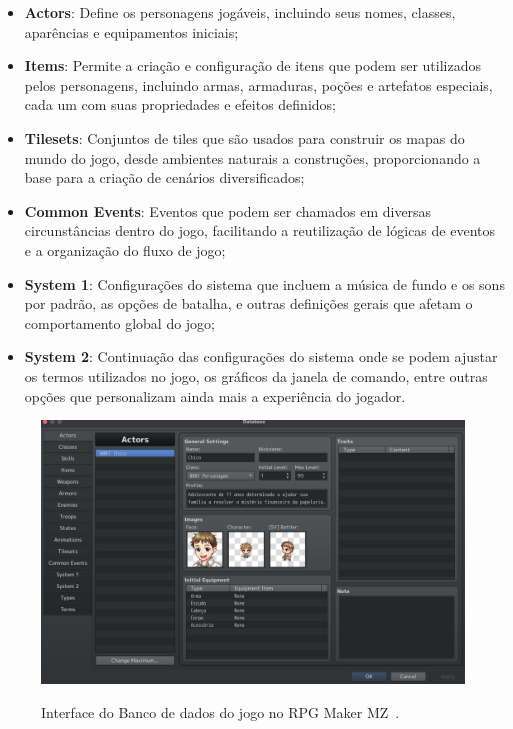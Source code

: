 \begin{itemize}
	\item \textbf{Actors}: Define os personagens jogáveis, incluindo seus nomes, classes, aparências e equipamentos iniciais;
	\item \textbf{Items}: Permite a criação e configuração de itens que podem ser utilizados pelos personagens, incluindo armas, armaduras, poções e artefatos especiais, cada um com suas propriedades e efeitos definidos;
	\item \textbf{Tilesets}: Conjuntos de tiles que são usados para construir os mapas do mundo do jogo, desde ambientes naturais a construções, proporcionando a base para a criação de cenários diversificados;
	\item \textbf{Common Events}: Eventos que podem ser chamados em diversas circunstâncias dentro do jogo, facilitando a reutilização de lógicas de eventos e a organização do fluxo de jogo;
	\item \textbf{System 1}: Configurações do sistema que incluem a música de fundo e os sons por padrão, as opções de batalha, e outras definições gerais que afetam o comportamento global do jogo;
	\item \textbf{System 2}: Continuação das configurações do sistema onde se podem ajustar os termos utilizados no jogo, os gráficos da janela de comando, entre outras opções que personalizam ainda mais a experiência do jogador.
\end{itemize}

\begin{figure}[ht]
	\centering
	\caption{Interface do Banco de dados do jogo no RPG Maker MZ~\cite{RPGMakerMZ}.}
	\includegraphics[scale=0.25]{Textuais/Pictures/DataBase.png}
	\label{fig:rpgmaker-interface-database}
\end{figure}

